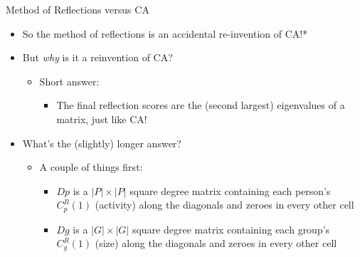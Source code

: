 \documentclass[
  ignorenonframetext,
]{beamer}
\providecommand{\tightlist}{%
  \setlength{\itemsep}{0pt}\setlength{\parskip}{0pt}}\usepackage{longtable,booktabs,array}
\begin{document}
\begin{frame}{Method of Reflections versus CA}
\protect\hypertarget{method-of-reflections-versus-ca}{}
\begin{itemize}
\item
  So the method of reflections is an accidental re-invention of CA!*
\item
  But \emph{why} is it a reinvention of CA?

  \begin{itemize}
  \tightlist
  \item
    Short answer:

    \begin{itemize}
    \tightlist
    \item
      The final reflection scores are the (second largest) eigenvalues
      of a matrix, just like CA!
    \end{itemize}
  \end{itemize}
\item
  What's the (slightly) longer answer?

  \begin{itemize}
  \tightlist
  \item
    A couple of things first:

    \begin{itemize}
    \tightlist
    \item
      \(Dp\) is a \(|P| \times |P|\) square degree matrix containing
      each person's \(C_p^R(1)\) (activity) along the diagonals and
      zeroes in every other cell
    \item
      \(Dg\) is a \(|G| \times |G|\) square degree matrix containing
      each group's \(C_g^R(1)\) (size) along the diagonals and zeroes in
      every other cell
    \end{itemize}
  \end{itemize}
\end{itemize}

\end{frame}
\end{document}
